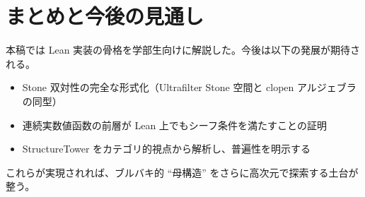 \documentclass[a4paper]{ltjsarticle}
\begin{document}
\section{まとめと今後の見通し}

本稿では Lean 実装の骨格を学部生向けに解説した。今後は以下の発展が期待される。
\begin{itemize}
  \item Stone 双対性の完全な形式化（Ultrafilter Stone 空間と clopen アルジェブラの同型）
  \item 連続実数値函数の前層が Lean 上でもシーフ条件を満たすことの証明
  \item StructureTower をカテゴリ的視点から解析し、普遍性を明示する
\end{itemize}
これらが実現されれば、ブルバキ的 ``母構造'' をさらに高次元で探索する土台が整う。
\end{document}
